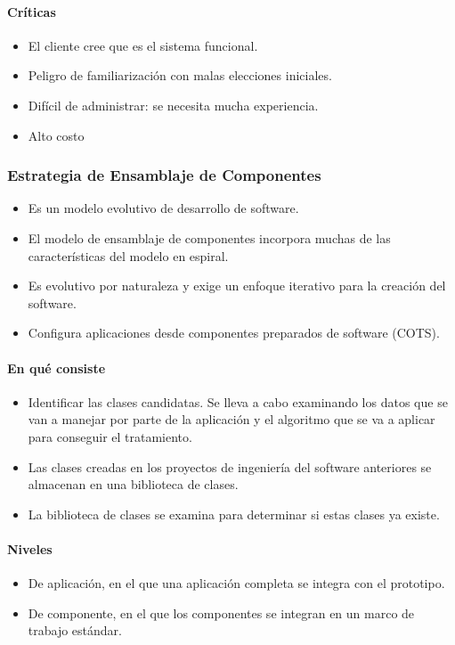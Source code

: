 \paragraph{Críticas}
\begin{itemize}
\item El cliente cree que es el sistema funcional.
\item Peligro de familiarización con malas elecciones iniciales.
\item Difícil de administrar: se necesita mucha experiencia.
\item Alto costo
\end{itemize}
\subsubsection{Estrategia de Ensamblaje de Componentes}
\begin{itemize}
\item Es un modelo evolutivo de desarrollo de software.
\item El modelo de ensamblaje de componentes incorpora muchas de las características del modelo en espiral.
\item Es evolutivo por naturaleza y exige un enfoque iterativo para la creación del software.
\item Configura aplicaciones desde componentes preparados de software (COTS).
\end{itemize}
\paragraph{En qué consiste}
\begin{itemize}
\item Identificar las clases candidatas. Se lleva a cabo examinando los datos que se van a manejar por parte de la aplicación y el algoritmo que se va a aplicar para conseguir el tratamiento.
\item Las clases creadas en los proyectos de ingeniería del software anteriores se almacenan en una biblioteca de clases.
\item La biblioteca de clases se examina para determinar si estas clases ya existe.
\end{itemize}
\paragraph{Niveles}
\begin{itemize}
\item De aplicación, en el que una aplicación completa se integra con el prototipo.
\item De componente, en el que los componentes se integran en un marco de trabajo estándar.
\end{itemize}
